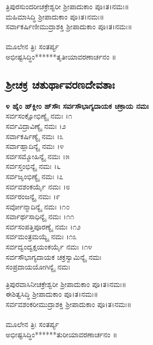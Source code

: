   ತ್ರಿಪುರಸುಂದರೀಚಕ್ರೇಶ್ವರೀ ಶ್ರೀಪಾದುಕಾಂ ಪೂ।ತ।ನಮಃ॥\\
 ಮಹಿಮಾಸಿದ್ಧಿ ಶ್ರೀಪಾದುಕಾಂ ಪೂ।ತ।ನಮಃ॥\\
 ಸರ್ವಾಕರ್ಷಿಣೀಮುದ್ರಾಶಕ್ತಿ ಶ್ರೀಪಾದುಕಾಂ ಪೂ।ತ।ನಮಃ॥\\
\\
ಮೂಲೇನ ತ್ರಿಃ ಸಂತರ್ಪ್ಯ\\
 ಅಭೀಷ್ಟಸಿದ್ಧಿಂ******ತೃತೀಯಾವರಣಾರ್ಚನಂ ॥
\subsection{ಶ್ರೀಚಕ್ರ ಚತುರ್ಥಾವರಣದೇವತಾಃ}
{\bfseries ೪ ಹೈಂ ಹ್‌ಕ್ಲೀಂ ಹ್‌ಸೌಃ ಸರ್ವಸೌಭಾಗ್ಯದಾಯಕ ಚಕ್ರಾಯ ನಮಃ}\\
 ಸರ್ವಸಂಕ್ಷೋಭಿಣ್ಯೈ ನಮಃ ।೧\\
 ಸರ್ವವಿದ್ರಾವಿಣ್ಯೈ ನಮಃ ।೨\\
 ಸರ್ವಾಕರ್ಷಿಣ್ಯೈ ನಮಃ ।೩\\
 ಸರ್ವಾಹ್ಲಾದಿನ್ಯೈ ನಮಃ ।೪\\
 ಸರ್ವಸಮ್ಮೋಹಿನ್ಯೈ ನಮಃ ।೫\\
 ಸರ್ವಸ್ತಂಭಿನ್ಯೈ ನಮಃ ।೬\\
 ಸರ್ವಜೃಂಭಿಣ್ಯೈ ನಮಃ ।೭\\
 ಸರ್ವವಶಂಕರ್ಯೈ ನಮಃ ।೮\\
 ಸರ್ವರಂಜನ್ಯೈ ನಮಃ ।೯\\
 ಸರ್ವೋನ್ಮಾದಿನ್ಯೈ ನಮಃ ।೧೦\\
 ಸರ್ವಾರ್ಥಸಾಧಿನ್ಯೈ ನಮಃ ।೧೧\\
 ಸರ್ವಸಂಪತ್ತಿಪೂರಣ್ಯೈ ನಮಃ ।೧೨\\
 ಸರ್ವಮಂತ್ರಮಯ್ಯೈ ನಮಃ ।೧೩\\
 ಸರ್ವದ್ವಂದ್ವಕ್ಷಯಂಕರ್ಯೈ ನಮಃ ।೧೪\\
ಸರ್ವಸೌಭಾಗ್ಯದಾಯಕ ಚಕ್ರಸ್ವಾಮಿನ್ಯೈ ನಮಃ\\
ಸಂಪ್ರದಾಯಯೋಗಿನ್ಯೈ ನಮಃ

 ತ್ರಿಪುರವಾಸಿನೀಚಕ್ರೇಶ್ವರೀ ಶ್ರೀಪಾದುಕಾಂ ಪೂ।ತ।ನಮಃ॥\\
 ಈಶಿತ್ವಸಿದ್ಧಿ ಶ್ರೀಪಾದುಕಾಂ ಪೂ।ತ।ನಮಃ॥\\
 ಸರ್ವವಶಂಕರೀಮುದ್ರಾಶಕ್ತಿ ಶ್ರೀಪಾದುಕಾಂ ಪೂ।ತ।ನಮಃ॥\\
\\
ಮೂಲೇನ ತ್ರಿಃ ಸಂತರ್ಪ್ಯ\\
 ಅಭೀಷ್ಟಸಿದ್ಧಿಂ******ತುರೀಯಾವರಣಾರ್ಚನಂ ॥
\newpage

